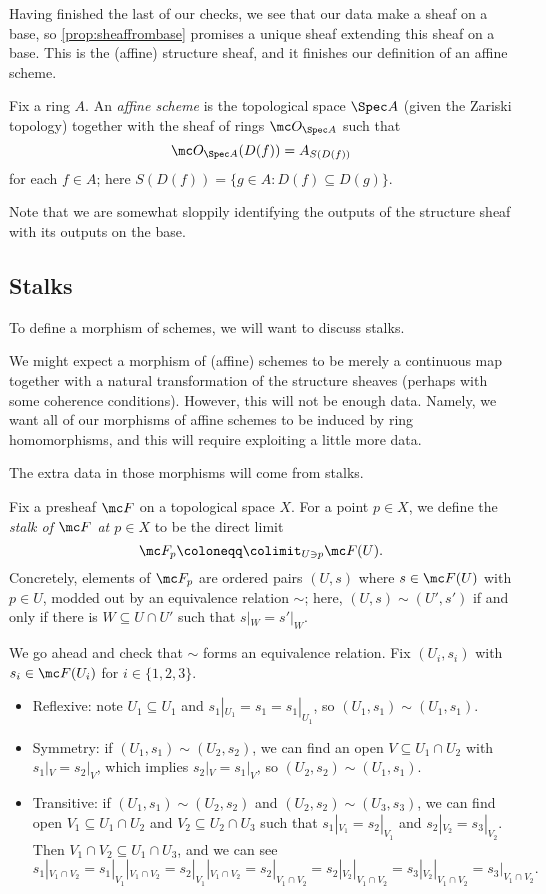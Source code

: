 \documentclass[../notes.tex]{subfiles}
\begin{document}
Having finished the last of our checks, we see that our data make a sheaf on a base, so \autoref{prop:sheaffrombase} promises a unique sheaf extending this sheaf on a base. This is the (affine) structure sheaf, and it finishes our definition of an affine scheme.
\begin{definition}
	Fix a ring $A$. An \textit{affine scheme} is the topological space $\Spec A$ (given the Zariski topology) together with the sheaf of rings $\mc O_{\Spec A}$ such that
	\[\mc O_{\Spec A}(D(f))=A_{S(D(f))}\]
	for each $f\in A$; here $S(D(f))=\{g\in A:D(f)\subseteq D(g)\}$.
\end{definition}
Note that we are somewhat sloppily identifying the outputs of the structure sheaf with its outputs on the base.

\subsection{Stalks}
To define a morphism of schemes, we will want to discuss stalks.
\begin{remark}
	We might expect a morphism of (affine) schemes to be merely a continuous map together with a natural transformation of the structure sheaves (perhaps with some coherence conditions). However, this will not be enough data. Namely, we want all of our morphisms of affine schemes to be induced by ring homomorphisms, and this will require exploiting a little more data.
\end{remark}
The extra data in those morphisms will come from stalks.
\begin{definition}[Stalk]
	Fix a presheaf $\mc F$ on a topological space $X$. For a point $p\in X$, we define the \textit{stalk of $\mc F$ at $p\in X$} to be the direct limit
	\[\mc F_p\coloneqq\colimit_{U\ni p}\mc F(U).\]
	Concretely, elements of $\mc F_p$ are ordered pairs $(U,s)$ where $s\in\mc F(U)$ with $p\in U$, modded out by an equivalence relation $\sim$; here, $(U,s)\sim(U',s')$ if and only if there is $W\subseteq U\cap U'$ such that $s|_W=s'|_W$.
\end{definition}
\begin{remark}
	We go ahead and check that $\sim$ forms an equivalence relation. Fix $(U_i,s_i)$ with $s_i\in\mc F(U_i)$ for $i\in\{1,2,3\}$.
	\begin{itemize}
		\item Reflexive: note $U_1\subseteq U_1$ and $s_1|_{U_1}=s_1=s_1|_{U_1}$, so $(U_1,s_1)\sim(U_1,s_1)$.
		\item Symmetry: if $(U_1,s_1)\sim(U_2,s_2)$, we can find an open $V\subseteq U_1\cap U_2$ with $s_1|_V=s_2|_V$, which implies $s_2|_V=s_1|_V$, so $(U_2,s_2)\sim(U_1,s_1)$.
		\item Transitive: if $(U_1,s_1)\sim(U_2,s_2)$ and $(U_2,s_2)\sim(U_3,s_3)$, we can find open $V_1\subseteq U_1\cap U_2$ and $V_2\subseteq U_2\cap U_3$ such that $s_1|_{V_1}=s_2|_{V_1}$ and $s_2|_{V_2}=s_3|_{V_2}$. Then $V_1\cap V_2\subseteq U_1\cap U_3$, and we can see
		\[s_1|_{V_1\cap V_2}=s_1|_{V_1}|_{V_1\cap V_2}=s_2|_{V_1}|_{V_1\cap V_2}=s_2|_{V_1\cap V_2}=s_2|_{V_2}|_{V_1\cap V_2}=s_3|_{V_2}|_{V_1\cap V_2}=s_3|_{V_1\cap V_2}.\]
	\end{itemize}
\end{remark}
\end{document}
